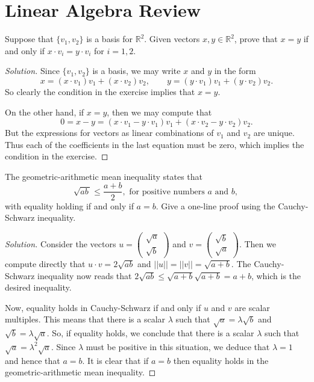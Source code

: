\documentclass[Shifrin_Solutions_Spring_2018.tex]{subfiles}
\begin{document}
\section{Linear Algebra Review}

\begin{exercise} Suppose that $\{ v_1, v_2 \}$ is a basis for $\mathbb{R}^2$. Given vectors $x, y \in \mathbb{R}^2$, prove that $x=y$ if and only if $x \cdot v_i = y \cdot v_i$ for $i = 1, 2$.
\end{exercise}

\begin{proof}[Solution] Since $\{v_1, v_2 \}$ is a basis, we may write $x$ and $y$ in the form
\[
x = (x\cdot v_1) v_1 + (x\cdot v_2) v_2 , \qquad y = (y\cdot v_1) v_1 + (y\cdot v_2) v_2 .
\]
So clearly the condition in the exercise implies that $x = y$.

On the other hand, if $x=y$, then we may compute that
\[
0 = x-y = (  x\cdot v_1 - y \cdot v_1) v_1 + (x\cdot v_2 - y\cdot v_2) v_2 .
\]
But the expressions for vectors as linear combinations of $v_1$ and $v_2$ are unique. Thus each of the coefficients in the last equation must be zero, which implies the condition in the exercise.
\end{proof}

\vspace{1cm}


\begin{exercise} The geometric-arithmetic mean inequality states that
\[
\sqrt{ab\,} \leq \dfrac{a+b}{2}, \text{ for positive numbers $a$ and $b$, }
\]
with equality holding if and only if $a=b$.
Give a one-line proof using the Cauchy-Schwarz inequality.
\end{exercise}

\begin{proof}[Solution]
Consider the vectors $ u = \begin{pmatrix} \sqrt{a }\\ \sqrt{b} \end{pmatrix}$ and $v = \begin{pmatrix} \sqrt{b } \\ \sqrt{a } \end{pmatrix}$. Then we compute directly that $u \cdot v = 2 \sqrt{ab }$
and $|| u || = ||v|| = \sqrt{ a+ b}$. The Cauchy-Schwarz inequality now reads that $2 \sqrt{ab} \leq \sqrt{a+b} \sqrt{a+b} = a + b$, which is the desired inequality.

Now, equality holds in Cauchy-Schwarz if and only if $u$ and $v$ are scalar multiples. This means that there is a scalar $\lambda$ such that $\sqrt{a} = \lambda\sqrt{b}$ and $\sqrt{b}= \lambda\sqrt{a}$. So, if equality holds, we conclude that there is a scalar $\lambda$ such that $\sqrt{a} = \lambda^2 \sqrt{a}$. Since $\lambda$ must be positive in this situation, we deduce that $\lambda = 1$ and hence that $a = b$. It is clear that if $a=b$ then equality holds in the geometric-arithmetic mean inequality.
\end{proof}
\end{document}
